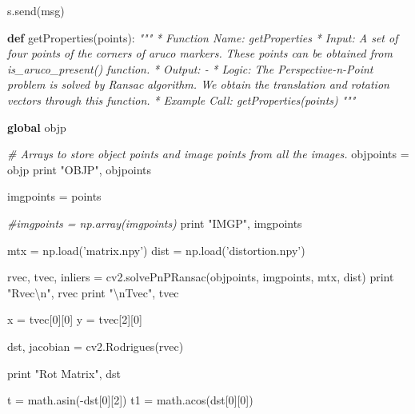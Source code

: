 \documentclass[]{article}
\newenvironment{Shaded}{}{}
\newcommand{\KeywordTok}[1]{\textcolor[rgb]{0.00,0.44,0.13}{\textbf{{#1}}}}
\newcommand{\DecValTok}[1]{\textcolor[rgb]{0.25,0.63,0.44}{{#1}}}
\newcommand{\CharTok}[1]{\textcolor[rgb]{0.25,0.44,0.63}{{#1}}}
\newcommand{\StringTok}[1]{\textcolor[rgb]{0.25,0.44,0.63}{{#1}}}
\newcommand{\CommentTok}[1]{\textcolor[rgb]{0.38,0.63,0.69}{\textit{{#1}}}}
\newcommand{\OperatorTok}[1]{\textcolor[rgb]{0.40,0.40,0.40}{{#1}}}
\newcommand{\BuiltInTok}[1]{{#1}}
\newcommand{\NormalTok}[1]{{#1}}
\begin{document}
\begin{Shaded}
\begin{Highlighting}[]
    \NormalTok{s.send(msg)}
    


\KeywordTok{def} \NormalTok{getProperties(points):}
    \CommentTok{"""}
\CommentTok{    * Function Name:    getProperties}
\CommentTok{    * Input:        A set of four points of the corners of aruco markers.}
\CommentTok{                        These points can be obtained from is_aruco_present()}
\CommentTok{                        function.}
\CommentTok{    * Output:       -}
\CommentTok{    * Logic:        The Perspective-n-Point problem is solved by Ransac}
\CommentTok{                        algorithm. We obtain the translation and rotation}
\CommentTok{                        vectors through this function.}
\CommentTok{    * Example Call: getProperties(points)}
\CommentTok{    """}

    \KeywordTok{global} \NormalTok{objp}
    
    \CommentTok{# Arrays to store object points and image points from all the images.}
    \NormalTok{objpoints }\OperatorTok{=} \NormalTok{objp}
    \BuiltInTok{print} \StringTok{"OBJP"}\NormalTok{, objpoints}
    
    \NormalTok{imgpoints }\OperatorTok{=} \NormalTok{points}

    \CommentTok{#imgpoints = np.array(imgpoints)}
    \BuiltInTok{print} \StringTok{"IMGP"}\NormalTok{, imgpoints}

    \NormalTok{mtx }\OperatorTok{=} \NormalTok{np.load(}\StringTok{'matrix.npy'}\NormalTok{)}
    \NormalTok{dist }\OperatorTok{=} \NormalTok{np.load(}\StringTok{'distortion.npy'}\NormalTok{)}

    \NormalTok{rvec, tvec, inliers }\OperatorTok{=} \NormalTok{cv2.solvePnPRansac(objpoints, imgpoints, mtx, dist)}
    \BuiltInTok{print} \StringTok{"Rvec}\CharTok{\textbackslash{}n}\StringTok{"}\NormalTok{, rvec}
    \BuiltInTok{print} \StringTok{"}\CharTok{\textbackslash{}n}\StringTok{Tvec"}\NormalTok{, tvec}

    \NormalTok{x }\OperatorTok{=} \NormalTok{tvec[}\DecValTok{0}\NormalTok{][}\DecValTok{0}\NormalTok{]}
    \NormalTok{y }\OperatorTok{=} \NormalTok{tvec[}\DecValTok{2}\NormalTok{][}\DecValTok{0}\NormalTok{]}

    \NormalTok{dst, jacobian }\OperatorTok{=} \NormalTok{cv2.Rodrigues(rvec)}

    \BuiltInTok{print} \StringTok{"Rot Matrix"}\NormalTok{, dst}

    \NormalTok{t }\OperatorTok{=} \NormalTok{math.asin(}\OperatorTok{-}\NormalTok{dst[}\DecValTok{0}\NormalTok{][}\DecValTok{2}\NormalTok{])}
    \NormalTok{t1 }\OperatorTok{=} \NormalTok{math.acos(dst[}\DecValTok{0}\NormalTok{][}\DecValTok{0}\NormalTok{])}


\end{Highlighting}
\end{Shaded}
\end{document}
